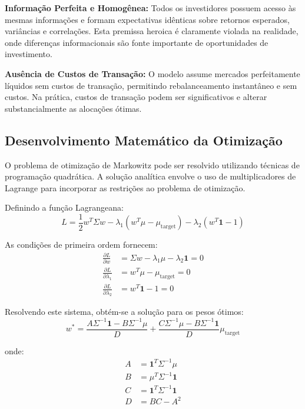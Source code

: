 \textbf{Informação Perfeita e Homogênea:} Todos os investidores possuem acesso às mesmas informações e formam expectativas idênticas sobre retornos esperados, variâncias e correlações. Esta premissa heroica é claramente violada na realidade, onde diferenças informacionais são fonte importante de oportunidades de investimento.

\textbf{Ausência de Custos de Transação:} O modelo assume mercados perfeitamente líquidos sem custos de transação, permitindo rebalanceamento instantâneo e sem custos. Na prática, custos de transação podem ser significativos e alterar substancialmente as alocações ótimas.

\subsection{Desenvolvimento Matemático da Otimização}

O problema de otimização de Markowitz pode ser resolvido utilizando técnicas de programação quadrática. A solução analítica envolve o uso de multiplicadores de Lagrange para incorporar as restrições ao problema de otimização.

Definindo a função Lagrangeana:
\begin{equation}
L = \frac{1}{2} w^T \Sigma w - \lambda_1 (w^T \mu - \mu_{\text{target}}) - \lambda_2 (w^T \mathbf{1} - 1)
\end{equation}

As condições de primeira ordem fornecem:
\begin{align}
\frac{\partial L}{\partial w} &= \Sigma w - \lambda_1 \mu - \lambda_2 \mathbf{1} = 0 \\
\frac{\partial L}{\partial \lambda_1} &= w^T \mu - \mu_{\text{target}} = 0 \\
\frac{\partial L}{\partial \lambda_2} &= w^T \mathbf{1} - 1 = 0
\end{align}

Resolvendo este sistema, obtém-se a solução para os pesos ótimos:
\begin{equation}
w^* = \frac{A \Sigma^{-1} \mathbf{1} - B \Sigma^{-1} \mu}{D} + \frac{C \Sigma^{-1} \mu - B \Sigma^{-1} \mathbf{1}}{D} \mu_{\text{target}}
\end{equation}

onde:
\begin{align}
A &= \mathbf{1}^T \Sigma^{-1} \mu \\
B &= \mu^T \Sigma^{-1} \mathbf{1} \\
C &= \mathbf{1}^T \Sigma^{-1} \mathbf{1} \\
D &= BC - A^2
\end{align}

